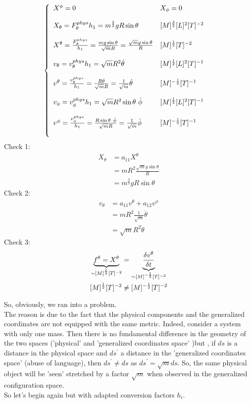 \begin{align}
&\left\{\begin{array}{ll}
X^{\phi}= 0&X_{\phi}= 0\\\\
X_{\theta} = F_{\theta}^{phys}{h_1} = m^{\frac{3}{2}}gR\sin{\theta}&[M]^{\frac{3}{2}}[L]^2[T]^{-2}\\\\
X^{\theta} = \frac{F_{\theta}^{phys}}{h_1} = \frac{mg\sin{\theta}}{\sqrt{m}R}=\frac{\sqrt{m}g\sin{\theta}}{R}&[M]^{\half}[T]^{-2}\\\\
v_{\theta} = v_{\theta}^{phys}{h_1} = \sqrt{m}R^2 \dot{\theta}&[M]^{\frac{1}{2}}[L]^2[T]^{-1}\\\\
v^{\theta} = \frac{v_{\theta}^{phys}}{h_1} = \frac{ R \dot{\theta}}{\sqrt{m}R}=\frac{1}{\sqrt{m}}\dot{\theta}&[M]^{-\half}[T]^{-1}\\\\
v_{\phi} = v_{\phi}^{phys}{h_1} = \sqrt{m}R^2\sin\theta \  \dot{\phi}&[M]^{\frac{1}{2}}[L]^2[T]^{-1}\\\\
v^{\phi} = \frac{v_{\phi}^{phys}}{h_1} = \frac{ R \sin\theta \ \dot{\phi}}{\sqrt{m}R}=\frac{1}{\sqrt{m}}\dot{\phi}&[M]^{-\half}[T]^{-1}\\\\
\end{array}\right.
\end{align}
Check 1:
\begin{align}
X_{\theta} &= a_{11}X^{\theta}\\
&= mR^2\frac{\sqrt{m}g\sin{\theta}}{R}\\
&= m^{\frac{3}{2}}gR\sin{\theta}
\end{align}
Check 2:
\begin{align}
v_{\theta} &= a_{11}v^{\theta}+ a_{12}v^{\phi}\\
&= mR^2\frac{1}{\sqrt{m}}\dot{\theta}\\
&= \sqrt{m}R^2\dot{\theta}
\end{align}
Check 3:
\begin{align}
\underbrace{f^{\theta} = X^{\theta}}_{\sim [M]^{\frac{1}{2}}[T]^{-2}}&= \underbrace{\frac{\delta v^{\theta}}{\delta t}}_{\sim [M]^{-\frac{1}{2}}[T]^{-2}}\\
[M]^{\frac{1}{2}}[T]^{-2}&\neq[M]^{-\frac{1}{2}}[T]^{-2} 
\end{align}

So, obviously, we ran into a problem.\\
The reason is due  to the fact that the physical components and the generalized coordinates are not equipped with the same metric. Indeed, consider a system with only one mass. Then there is no fundamental difference in the geometry of the two spaces ('physical' and 'generalized coordinates space' )but , if $ds$ is a distance in the physical space and $ds^{'}$ a distance in the 'generalized coordinates space' (abuse of language), then $ds^{'}\neq ds$ as $ds^{'}= \sqrt{m} ds$. So, the same physical object will be 'seen' stretched by a factor $\sqrt{m}$ when observed in the generalized configuration space.\\
So let's begin again but with adapted conversion factors $h_i$.

